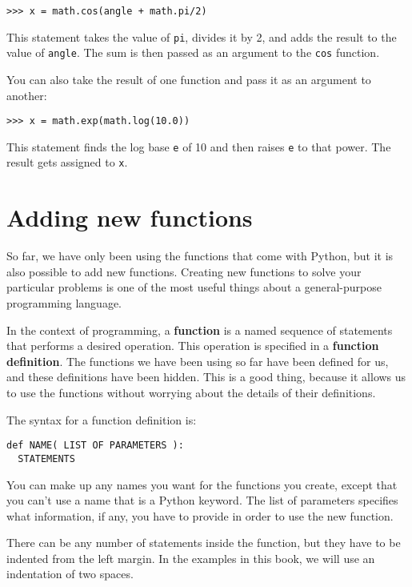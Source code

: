 \beforeverb
\begin{verbatim}
>>> x = math.cos(angle + math.pi/2)
\end{verbatim}
\afterverb
%
This statement takes the value of {\tt pi}, divides it by 2, and adds
the result to the value of {\tt angle}.  The sum is then passed as an
argument to the {\tt cos} function.

You can also take the result of one function and pass it as an argument to
another:

\beforeverb
\begin{verbatim}
>>> x = math.exp(math.log(10.0))
\end{verbatim}
\afterverb
%
This statement finds the log base {\tt e} of 10 and then raises {\tt e} to
that power. The result gets assigned to {\tt x}.


\section{Adding new functions}

So far, we have only been using the functions that come with Python,
but it is also possible to add new functions.  Creating new functions
to solve your particular problems is one of the most useful things
about a general-purpose programming language.

In the context of programming, a {\bf function} is a named sequence of
statements that performs a desired operation.  This operation is specified
in a {\bf function definition}.  The functions we have been using so far have
been defined for us, and these definitions have been hidden.  This is a good
thing, because it allows us to use the functions without worrying about the
details of their definitions.


The syntax for a function definition is:

\beforeverb
\begin{verbatim}
def NAME( LIST OF PARAMETERS ):
  STATEMENTS
\end{verbatim}
\afterverb
%
You can make up any names you want for the functions you create, except that
you can't use a name that is a Python keyword.  The list of parameters
specifies what information, if any, you have to provide in order to
use the new function.

There can be any number of statements inside the function, but they
have to be indented from the left margin.  In the examples in this
book, we will use an indentation of two spaces.

